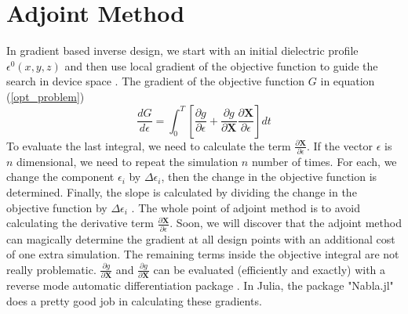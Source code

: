 \documentclass{tufte-handout}
\begin{document}
 \section{Adjoint Method}
 In gradient based inverse design, we start with an initial dielectric profile $\epsilon^{0}(x,y,z)$  and then use local  gradient of the objective function to guide the search in device space . The gradient of the objective function $G$ in equation (\ref{opt_problem})
 \begin{equation}
 \frac{d G}{d\epsilon} = \int_{0}^{T} \left[  \frac{\partial g}{\partial \epsilon} +  \frac{\partial g}{\partial \mathbf{X}} \frac{\partial \mathbf{X}}{\partial \epsilon}\right] dt
 \end{equation}
 To evaluate the last integral, we need to calculate the term $ \frac{\partial \mathbf{X}}{\partial \epsilon}$. If the vector $\epsilon$ is $n$ dimensional, we need to repeat the simulation $n$ number of times. For each, we change the component $\epsilon_i$ by $\Delta \epsilon_i$, then the change in the objective function is determined. Finally, the slope is calculated by dividing the change in the objective function by $\Delta \epsilon_i$ . The whole point of adjoint method is to avoid calculating the derivative term $ \frac{\partial \mathbf{X}}{\partial \epsilon}$. Soon, we will discover that the adjoint method can magically determine the gradient at all design points with an additional cost of one extra simulation. The remaining terms inside the objective integral are not really problematic. $\frac{\partial g}{\partial \mathbf{X}}$ and $\frac{\partial g}{\partial \mathbf{X}}$ can be evaluated (efficiently and exactly) with a reverse mode  automatic differentiation package . In Julia, the package "Nabla.jl" does a pretty good job in calculating these gradients.
 
\end{document}
